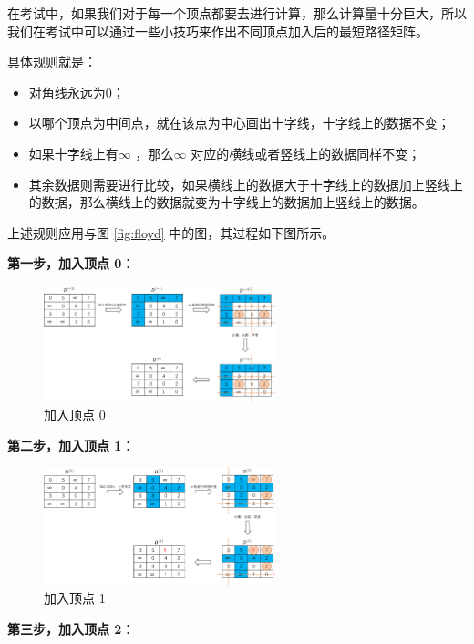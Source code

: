 \documentclass[lang=cn,newtx,10pt,scheme=chinese]{../elegantbook}
\begin{document}
在考试中，如果我们对于每一个顶点都要去进行计算，那么计算量十分巨大，所以我们在考试中可以通过一些小技巧来作出不同顶点加入后的最短路径矩阵。

具体规则就是：

\begin{itemize}
  \item 对角线永远为0；
  \item 以哪个顶点为中间点，就在该点为中心画出十字线，十字线上的数据不变；
  \item 如果十字线上有$\infty$ ，那么$\infty$ 对应的横线或者竖线上的数据同样不变；
  \item 其余数据则需要进行比较，如果横线上的数据大于十字线上的数据加上竖线上的数据，那么横线上的数据就变为十字线上的数据加上竖线上的数据。
\end{itemize}


上述规则应用与图 \ref{fig:floyd} 中的图，其过程如下图所示。

\textbf{第一步，加入顶点 0}：

\begin{figure}[h!]
  \centering
  \includegraphics[width=0.6\textwidth]{./figure/pdf/cropped/floyd_addNum0.pdf}
  \caption{加入顶点 0}
  \label{fig:floyd_0}
\end{figure}

\textbf{第二步，加入顶点 1}：

\begin{figure}[h!]
  \centering
  \includegraphics[width=0.6\textwidth]{./figure/pdf/cropped/floyd_addNum1.pdf}
  \caption{加入顶点 1}
  \label{fig:floyd_1}

\end{figure}

\textbf{第三步，加入顶点 2}：
\end{document}

